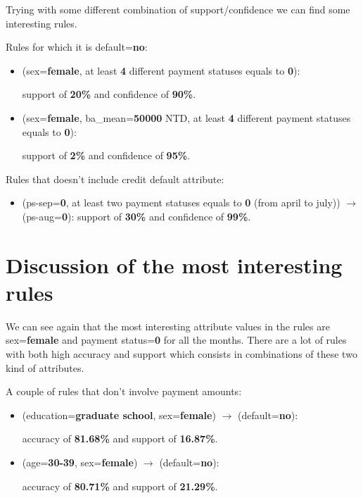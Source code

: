 \medskip

Trying with some different combination of support/confidence we can find some interesting rules.

Rules for which it is default=\textbf{no}:

\begin{itemize}
  \item (sex=\textbf{female}, at least \textbf{4} different payment statuses equals to \textbf{0}):
  
  \tab support of \textbf{20\%} and confidence of \textbf{90\%}.

  \item (sex=\textbf{female}, ba\_mean=\textbf{50000} NTD, at least \textbf{4} different payment statuses equals to \textbf{0}):
  
  \tab support of \textbf{2\%} and confidence of \textbf{95\%}.

\end{itemize}

Rules that doesn't include credit default attribute:

\begin{itemize}
  \item (ps-sep=\textbf{0}, at least two payment statuses equals to \textbf{0} (from april to july)) $\rightarrow$ (ps-aug=\textbf{0}):
  \tab support of \textbf{30\%} and confidence of \textbf{99\%}.
\end{itemize}

\section{Discussion of the most interesting rules}

We can see again that the most interesting attribute values in the rules are sex=\textbf{female} and payment status=\textbf{0} for all the months. There are a lot of rules with both high accuracy and support which consists in combinations of these two kind of attributes. 

\smallskip

A couple of rules that don't involve payment amounts:

\begin{itemize}
  \item (education=\textbf{graduate school}, sex=\textbf{female}) $\rightarrow$ (default=\textbf{no}):
  
    \tab accuracy of \textbf{81.68\%} and support of \textbf{16.87\%}.
  \item (age=\textbf{30-39}, sex=\textbf{female}) $\rightarrow$ (default=\textbf{no}):
  
    \tab accuracy of \textbf{80.71\%} and support of \textbf{21.29\%}.
\end{itemize}

